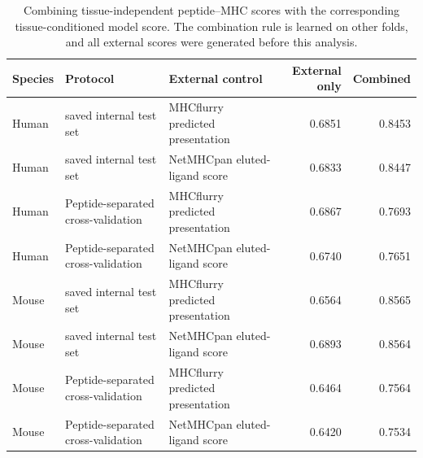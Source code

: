 \begin{table}[!t]
\par\vspace{1.1\baselineskip}
\centering
\caption{Combining tissue-independent peptide--MHC scores with the corresponding tissue-conditioned model score. The combination rule is learned on other folds, and all external scores were generated before this analysis.}
\label{tab:appendix-general-stacking}
\fontsize{8.5}{9.5}\selectfont
\setlength{\tabcolsep}{3pt}
\begin{tabularx}{\textwidth}{>{\raggedright\arraybackslash}p{1.0cm}
                            >{\raggedright\arraybackslash}X
                            >{\raggedright\arraybackslash}Xrr}
\toprule
Species & Protocol & External control & External only & Combined \\
\midrule
Human & saved internal test set & MHCflurry predicted presentation & 0.6851 & 0.8453 \\
Human & saved internal test set & NetMHCpan eluted-ligand score & 0.6833 & 0.8447 \\
Human & Peptide-separated cross-validation & MHCflurry predicted presentation & 0.6867 & 0.7693 \\
Human & Peptide-separated cross-validation & NetMHCpan eluted-ligand score & 0.6740 & 0.7651 \\
Mouse & saved internal test set & MHCflurry predicted presentation & 0.6564 & 0.8565 \\
Mouse & saved internal test set & NetMHCpan eluted-ligand score & 0.6893 & 0.8564 \\
Mouse & Peptide-separated cross-validation & MHCflurry predicted presentation & 0.6464 & 0.7564 \\
Mouse & Peptide-separated cross-validation & NetMHCpan eluted-ligand score & 0.6420 & 0.7534 \\
\bottomrule
\end{tabularx}
\end{table}
